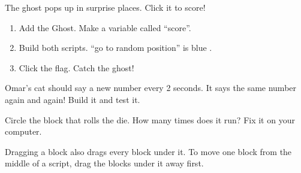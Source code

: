 \begin{exercise}
The ghost pops up in surprise places. Click it to score!
\begin{enumerate}[leftmargin=1.4em,itemsep=2pt]
  \item Add the Ghost. Make a variable called \enquote{score}.
  \item Build both scripts. \enquote{go to random position} is blue .
  \item Click the flag. Catch the ghost!
\end{enumerate}
\begin{center}
\begin{scratch}[scale=0.85]
\end{scratch}
\qquad
\begin{scratch}[scale=0.85]
\end{scratch}
\end{center}
\end{exercise}

\begin{exercise}
Omar's cat should say a new number every 2 seconds. It says the same number again and again! Build it and test it.
\begin{center}
\begin{scratch}[scale=0.85]
\end{scratch}
\end{center}
Circle the block that rolls the die. How many times does it run? Fix it on your computer.
\end{exercise}

\begin{grownup}
Dragging a block also drags every block under it. To move one block from the middle of a script, drag the blocks under it away first.
\end{grownup}

\begin{vocab}
\end{vocab}

